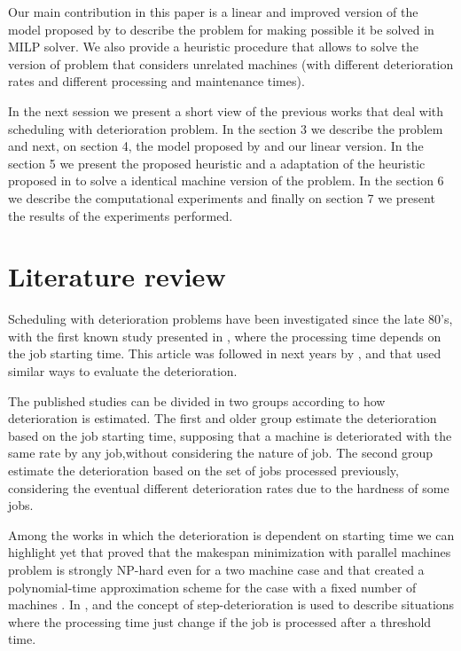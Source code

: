 \documentclass[a4paper,11pt]{article}
\begin{document}
 Our main contribution in this paper is a linear and improved version of the model proposed by \citep{ruiz2017makespan} to describe the problem for making possible it be solved in MILP solver. We also provide a heuristic procedure that allows to solve the version of problem that considers unrelated machines (with different deterioration rates and different processing and maintenance times).
 
 In the next session we present a short view of the previous works that deal with scheduling with deterioration problem. In the section 3 we describe the problem and next, on section 4, the model proposed by \citep{ruiz2017makespan} and our linear version. In the section 5 we present the proposed heuristic and a adaptation of the heuristic proposed in \citep{ruiz2017makespan} to solve a identical machine version of the problem. In the section 6 we describe the computational experiments and finally on section 7 we present the results of the experiments performed.  
 
\section{Literature review}

 Scheduling with deterioration problems have been investigated since the late 80's, with the first known study presented in \citep{gupta1988single}, where the processing time depends on the job starting time. This article was followed in next years by \citep{browne1990scheduling}, \citep{mosheiov1991v} and \citep{mosheiov1994scheduling} that used similar ways to evaluate the deterioration. 
 
 The published studies can be divided in two groups according to how deterioration is estimated. The first and older group estimate the deterioration based on the job starting time, supposing that a machine is deteriorated with the same rate by any job,without considering the nature of job. The second group estimate the deterioration based on the set of jobs processed previously, considering the eventual different deterioration rates due to the hardness of some jobs.  
 
 Among the works in which the deterioration is dependent on starting time we can highlight yet \citep{Mosheiov1998} that proved that the makespan minimization with parallel machines problem is strongly NP-hard even for a two machine case and \citep{JI2008342} that created a polynomial-time approximation scheme for the case with a fixed number of machines . In \citep{cheng2001single}, \citep{leung2008minimizing} and \citep{lalla2016modeling} the concept of step-deterioration is used to describe situations where the processing time just change if the job is processed after a threshold time. 
 
\end{document}
